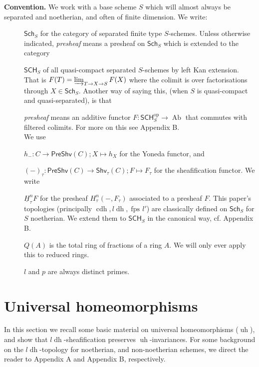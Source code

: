 \documentclass[10pt]{amsart}
\theoremstyle{definition}
\newtheorem*{conv}{Convention}
\DeclareMathOperator{\Ab}{Ab}
\newcommand{\PreShv}{\mathsf{PreShv}}
\newcommand{\Shv}{\mathsf{Shv}}
\newcommand{\Sch}{\mathsf{Sch}}
\newcommand{\SCH}{\mathsf{SCH}}
\newcommand{\op}{{\operatorname{op}}}
\newcommand{\fpsl}{{\operatorname{fps\!}l'}}
\newcommand{\cdh}{{{\operatorname{cdh}}}}
\newcommand{\ldh}{{l{\operatorname{dh}}}}
\newcommand{\uh}{\operatorname{uh}}
\begin{document}
\textbf{Convention.} \label{convention} We work with a base scheme $S$ which will almost always be separated and noetherian, and often of finite dimension. We write:
\renewcommand{\descriptionlabel}[1]{%
  \hspace\labelsep \upshape\bfseries #1.%
}
\begin{description}
 \item[] $\Sch_S$ for the category of separated finite type $S$-schemes. Unless otherwise indicated, \emph{presheaf} means a presheaf on $\Sch_S$ which is extended to the category 
 \item[] $\SCH_S$ of all quasi-compact separated $S$-schemes by left Kan extension. That is $F(T) = \varinjlim_{T \to X \to S} F(X)$ where the colimit is over factorisations through $X \in \Sch_S$. Another way of saying this, (when $S$ is quasi-compact and quasi-separated), is that 
 
 \item[] \emph{presheaf} means an additive functor $F: \SCH_S^\op \to \Ab$ that commutes with filtered colimits. For more on this see Appendix B. \\%

We use
 \item[] $h_-: C \to \PreShv(C); X \mapsto h_X$ for the Yoneda functor, and 
 \item[] $(-)_\tau: \PreShv(C) \to \Shv_\tau(C); F \mapsto F_\tau$ for the sheafification functor. We write 
 \item[] $\underline{H}_\tau^n F$ for the presheaf $H^n_\tau(-, F_\tau)$ associated to a presheaf $F$. This paper's topologies (principally $\cdh, \ldh, \fpsl$) are classically defined on $\Sch_S$ for $S$ noetherian. We extend them to $\SCH_S$ in the canonical way, cf. Appendix B.
 \item[] $Q(A)$ is the total ring of fractions of a ring $A$. We will only ever apply this to reduced rings.
 \item[] $l$ and $p$ are always distinct primes.
\end{description}

\section{Universal homeomorphisms} \label{sec:uh}

In this section we recall some basic material on universal homeomorphisms ($\uh$), and show that $\ldh$-sheafification preserves $\uh$-invariances. For some background on the $\ldh$-topology for noetherian, and non-noetherian schemes, we direct the reader to Appendix A and Appendix B, respectively.
\end{document}
